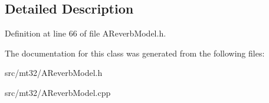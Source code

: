 \subsection{Detailed Description}


Definition at line 66 of file A\-Reverb\-Model.\-h.



The documentation for this class was generated from the following files\-:\begin{DoxyCompactItemize}
\item 
src/mt32/A\-Reverb\-Model.\-h\item 
src/mt32/A\-Reverb\-Model.\-cpp\end{DoxyCompactItemize}
